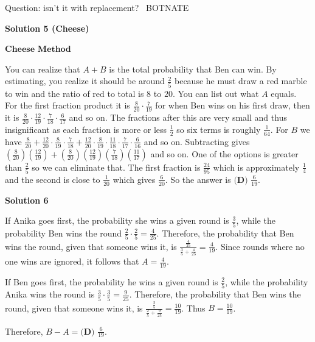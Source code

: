 \begin{enumerate}
 Question: isn't it with replacement? ~BOTNATE

 



\textbf{Solution 5 (Cheese)}

$\textbf{Cheese Method}$

 You can realize that $A+B$ is the total probability that Ben can win. By estimating, you realize it should be around $\frac{2}{5}$ because he must draw a red marble to win and the ratio of red to total is $8$ to $20$. You can list out what $A$ equals. For the first fraction product it is $\frac{8}{20} \cdot \frac{7}{19}$ for when Ben wins on his first draw, then it is $\frac{8}{20} \cdot \frac{12}{19} \cdot \frac{7}{18} \cdot \frac{6}{17}$ and so on. The fractions after this are very small and thus insignificant as each fraction is more or less $\frac{1}{2}$ so six terms is roughly $\frac{1}{64}$. For $B$ we have $\frac{8}{20} + \frac{12}{20} \cdot \frac{8}{19} \cdot \frac{7}{18} + \frac{12}{20} \cdot \frac{8}{19} \cdot \frac{11}{18} \cdot \frac{7}{17} \cdot \frac{6}{16}$ and so on. Subtracting gives $\left(\frac{8}{20}\right)\left(\frac{12}{19}\right) + \left(\frac{8}{20}\right)\left(\frac{12}{19}\right)\left(\frac{7}{18}\right)\left(\frac{11}{17}\right)$ and so on. One of the options is greater than $\frac{2}{5}$ so we can eliminate that. The first fraction is $\frac{24}{95}$ which is approximately $\frac{1}{4}$ and the second is close to $\frac{1}{20}$ which gives $\frac{6}{20}$. So the answer is $\boxed{\textbf{(D) }\frac{6}{19}}$.

 



\textbf{Solution 6}

If Anika goes first, the probability she wins a given round is $\frac{3}{5}$, while the probability Ben wins the round $\frac{2}{5}\cdot\frac{2}{5}=\frac{4}{25}$.  Therefore, the probability that Ben wins the round, given that someone wins it, is $\frac{\frac{4}{25}}{\frac{3}{5}+\frac{4}{25}} = \frac{4}{19}$.  Since rounds where no one wins are ignored, it follows that $A = \frac{4}{19}$.  

 If Ben goes first, the probability he wins a given round is $\frac{2}{5}$, while the probability Anika wins the round is $\frac{3}{5}\cdot\frac{3}{5}=\frac{9}{25}$.  Therefore, the probability that Ben wins the round, given that someone wins it, is $\frac{\frac{2}{5}}{\frac{2}{5}+\frac{9}{25}} = \frac{10}{19}$.  Thus $B = \frac{10}{19}$.

 Therefore, $B-A = \boxed{\textbf{(D) } \frac{6}{19}}$.


\end{enumerate}
